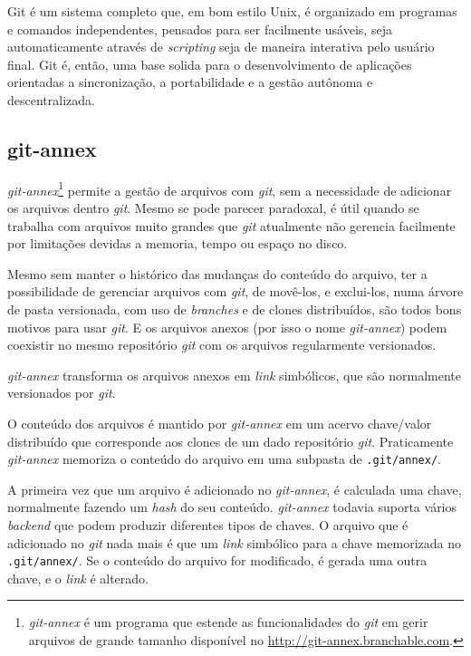 Git é um sistema completo que, em bom estilo Unix, é organizado em
programas e comandos independentes, pensados para ser facilmente
usáveis, seja automaticamente através de \emph{scripting} seja de
maneira interativa pelo usuário final. Git é, então, uma base solida
para o desenvolvimento de aplicações orientadas a sincronização, a
portabilidade e a gestão autônoma e descentralizada. 

\subsection{git-annex}\label{git-annex}
\emph{git-annex}\footnote{\emph{git-annex} é um programa que estende
  as funcionalidades do \emph{git} em gerir arquivos de grande tamanho
disponível no \url{http://git-annex.branchable.com}.} permite a
gestão de arquivos com \emph{git}, sem a necessidade de adicionar os
arquivos dentro \emph{git}. Mesmo se pode parecer paradoxal, é útil
quando se trabalha com arquivos muito grandes que \emph{git}
atualmente não gerencia facilmente por limitações devidas a memoria,
tempo ou espaço no disco.

Mesmo sem manter o histórico das mudanças do conteúdo do arquivo, ter
a possibilidade de gerenciar arquivos com \emph{git}, de movê-los, e
exclui-los, numa árvore de pasta versionada, com uso de
\emph{branches} e de clones distribuídos, são todos bons motivos para
usar \emph{git}. E os arquivos anexos (por isso o nome
\emph{git-annex}) podem coexistir no mesmo repositório \emph{git} com
os arquivos regularmente versionados. 

\emph{git-annex} transforma os arquivos anexos em \emph{link}
simbólicos, que são normalmente versionados por \emph{git}. 

O conteúdo dos arquivos é mantido por \emph{git-annex} em um acervo
chave/valor distribuído que corresponde aos clones de um dado
repositório \emph{git}. Praticamente \emph{git-annex} memoriza o
conteúdo do arquivo em uma subpasta de \verb|.git/annex/|.

A primeira vez que um arquivo é adicionado no \emph{git-annex}, é
calculada uma chave, normalmente fazendo um \emph{hash} do seu
conteúdo. \emph{git-annex} todavia suporta vários \emph{backend} que
podem produzir diferentes tipos de chaves. O arquivo que é adicionado
no \emph{git} nada mais é que um \emph{link} simbólico para a chave
memorizada no \verb|.git/annex/|. Se o conteúdo do arquivo for
modificado, é gerada uma outra chave, e o \emph{link} é alterado. 

